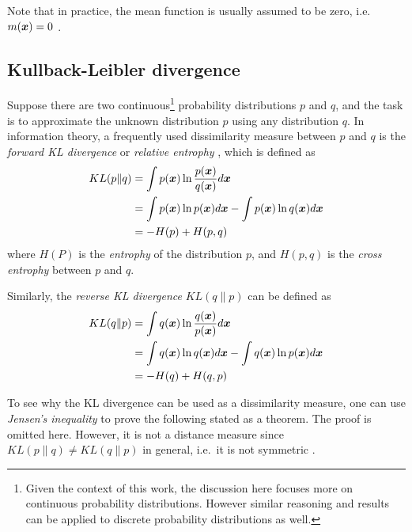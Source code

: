 Note that in practice, the mean function is usually assumed to be zero, i.e.\ $m(\boldsymbol{x}) = 0$ \citep{rasmussen2006gaussian}.

\subsection{Kullback-Leibler divergence}
\label{sec-kl}

Suppose there are two continuous\footnote{Given the context of this work, the discussion here focuses more on continuous probability distributions. However similar reasoning and results can be applied to discrete probability distributions as well.} probability distributions $p$ and $q$, and the task is to approximate the unknown distribution $p$ using any distribution $q$.
In information theory, a frequently used dissimilarity measure between $p$ and $q$ is the \emph{forward KL divergence} or \emph{relative entrophy} \citep{kullback1951information}, which is defined as
\begin{align}
    KL(p\|q) 
    & = \int{p(\boldsymbol{x})\ln{\frac{p(\boldsymbol{x})}{q(\boldsymbol{x})}}d\boldsymbol{x}} 
    \label{eq-kl-forward}
    \\
    & = \int{p(\boldsymbol{x})\ln{p(\boldsymbol{x})}d\boldsymbol{x}} 
        - \int{p(\boldsymbol{x})\ln{q(\boldsymbol{x})}d\boldsymbol{x}} 
    \nonumber
    \\
    & = -H(p) + H(p, q)
    \nonumber
\end{align}
where $H(P)$ is the \emph{entrophy} of the distribution $p$, and $H(p, q)$ is the \emph{cross entrophy} between $p$ and $q$.

Similarly, the \emph{reverse KL divergence} $KL(q\|p)$ can be defined as
\begin{align}
    KL(q\|p) 
    & = \int{q(\boldsymbol{x})\ln{\frac{q(\boldsymbol{x})}{p(\boldsymbol{x})}}d\boldsymbol{x}} 
    \label{eq-kl-reverse}
    \\
    & = \int{q(\boldsymbol{x})\ln{q(\boldsymbol{x})}d\boldsymbol{x}} 
        - \int{q(\boldsymbol{x})\ln{p(\boldsymbol{x})}d\boldsymbol{x}}
    \nonumber
    \\
    & = -H(q) + H(q, p)
    \nonumber
\end{align}

To see why the KL divergence can be used as a dissimilarity measure, one can use \emph{Jensen's inequality} \citep{jensen1906fonctions} to prove the following stated as a theorem.
The proof \citep[]{bishop2006pattern} is omitted here.
However, it is not a distance measure since $KL(p\|q) \neq KL(q\|p)$ in general, i.e.\ it is not symmetric \citep{goodfellow2016deep}.

